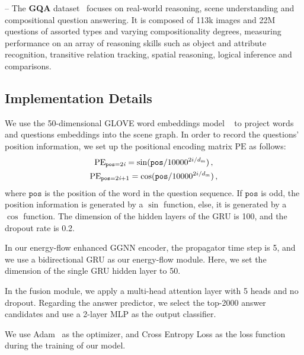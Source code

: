 \documentclass[letterpaper]{article} %
\begin{document}
\noindent --  The \textbf{GQA} dataset~\cite{DBLP:conf/cvpr/HudsonM19} focuses on real-world reasoning, scene understanding and compositional question answering. 
It is composed of 113k images and 22M questions of assorted types and varying compositionality degrees, measuring performance on an array of reasoning skills such as object and attribute recognition, transitive relation tracking, spatial reasoning, logical inference and comparisons.



\subsection{Implementation Details}

We use the 50-dimensional GLOVE word embeddings model ~\cite{pennington-etal-2014-glove} to project words and questions embeddings into the scene graph. 
In order to record the questions' position information, we set up the positional encoding matrix $\textrm{PE}$ as follows:
\begin{gather}\notag
    \textrm{PE}_{\texttt{pos}=2\emph{i}} = \sin(\texttt{pos}/10000^{2i/d_{\textrm{m}}}) \, ,\\
    \textrm{PE}_{\texttt{pos}=2\emph{i}+1} = \cos(\texttt{pos}/10000^{2i/d_{\textrm{m}}}) \, , \notag
\end{gather}
where $\texttt{pos}$ is the position of the word in the question sequence.
If $\texttt{pos}$ is odd, the position information is generated by a $\sin$ function, else, it is generated by a $\cos$ function. 
The dimension of the hidden layers of the GRU is 100, and the dropout rate is 0.2.

 In our energy-flow enhanced GGNN encoder, the propagator time step is 5, and we use a bidirectional GRU as our energy-flow module. 
 Here, we set the dimension of the single GRU hidden layer to 50. 

 In the fusion module, we apply a multi-head attention layer with 5 heads and no dropout. Regarding the answer predictor, we select the top-2000 answer candidates and use a 2-layer MLP as the output classifier.

We use Adam~\cite{kingma2014adam} as the optimizer, and Cross Entropy Loss as the loss function during the training of our model. 
\end{document}

